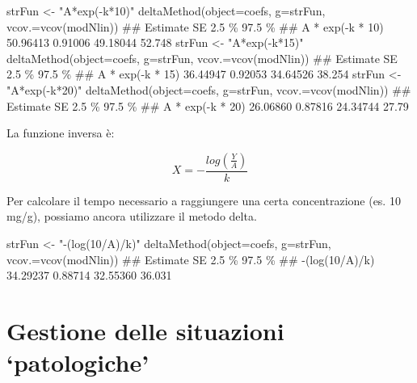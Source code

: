 \documentclass[a4paper,12pt,oneside]{book}
\newenvironment{Shaded}{\begin{snugshade}}{\end{snugshade}}
\newcommand{\StringTok}[1]{#1}
\newcommand{\DocumentationTok}[1]{#1}
\newcommand{\OtherTok}[1]{#1}
\newcommand{\FunctionTok}[1]{#1}
\newcommand{\AttributeTok}[1]{#1}
\newcommand{\NormalTok}[1]{#1}
\begin{document}
\begin{Shaded}
\begin{Highlighting}[]
\NormalTok{strFun }\OtherTok{\textless{}{-}} \StringTok{"A*exp({-}k*10)"}
\FunctionTok{deltaMethod}\NormalTok{(}\AttributeTok{object=}\NormalTok{coefs, }\AttributeTok{g=}\NormalTok{strFun, }\AttributeTok{vcov.=}\FunctionTok{vcov}\NormalTok{(modNlin))}
\DocumentationTok{\#\#                  Estimate       SE    2.5 \% 97.5 \%}
\DocumentationTok{\#\# A * exp({-}k * 10) 50.96413  0.91006 49.18044 52.748}
\NormalTok{strFun }\OtherTok{\textless{}{-}} \StringTok{"A*exp({-}k*15)"}
\FunctionTok{deltaMethod}\NormalTok{(}\AttributeTok{object=}\NormalTok{coefs, }\AttributeTok{g=}\NormalTok{strFun, }\AttributeTok{vcov.=}\FunctionTok{vcov}\NormalTok{(modNlin))}
\DocumentationTok{\#\#                  Estimate       SE    2.5 \% 97.5 \%}
\DocumentationTok{\#\# A * exp({-}k * 15) 36.44947  0.92053 34.64526 38.254}
\NormalTok{strFun }\OtherTok{\textless{}{-}} \StringTok{"A*exp({-}k*20)"}
\FunctionTok{deltaMethod}\NormalTok{(}\AttributeTok{object=}\NormalTok{coefs, }\AttributeTok{g=}\NormalTok{strFun, }\AttributeTok{vcov.=}\FunctionTok{vcov}\NormalTok{(modNlin))}
\DocumentationTok{\#\#                  Estimate       SE    2.5 \% 97.5 \%}
\DocumentationTok{\#\# A * exp({-}k * 20) 26.06860  0.87816 24.34744  27.79}
\end{Highlighting}
\end{Shaded}

La funzione inversa è:

\[X = - \frac{log \left( \frac{Y}{A} \right)}{k} \]

Per calcolare il tempo necessario a raggiungere una certa concentrazione (es. 10 mg/g), possiamo ancora utilizzare il metodo delta.

\begin{Shaded}
\begin{Highlighting}[]
\NormalTok{strFun }\OtherTok{\textless{}{-}} \StringTok{"{-}(log(10/A)/k)"}
\FunctionTok{deltaMethod}\NormalTok{(}\AttributeTok{object=}\NormalTok{coefs, }\AttributeTok{g=}\NormalTok{strFun, }\AttributeTok{vcov.=}\FunctionTok{vcov}\NormalTok{(modNlin))}
\DocumentationTok{\#\#                Estimate       SE    2.5 \% 97.5 \%}
\DocumentationTok{\#\# {-}(log(10/A)/k) 34.29237  0.88714 32.55360 36.031}
\end{Highlighting}
\end{Shaded}

\hypertarget{gestione-delle-situazioni-patologiche}{%
\section{Gestione delle situazioni `patologiche'}\label{gestione-delle-situazioni-patologiche}}
\end{document}
